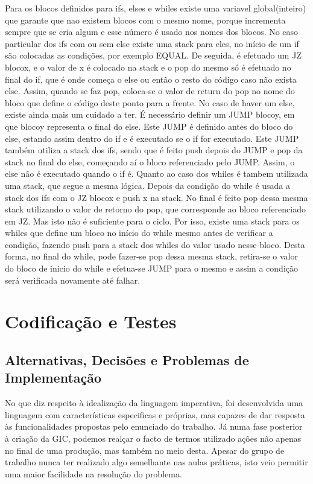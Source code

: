 \documentclass{report}
\begin{document}
Para os blocos definidos para ifs, elses e whiles existe uma variavel global(inteiro) que garante que nao existem blocos com o mesmo 
nome, porque incrementa sempre que se cria algum e esse número é usado nos nomes dos blocos. 
No caso particular dos ifs com ou sem else existe uma stack para eles, no início de um if são colocadas as condições, por exemplo
EQUAL. De seguida, é efetuado um JZ blocox, e o valor de x é colocado na stack e o pop do mesmo só é efetuado no final do if, que é 
onde começa o else ou então o resto do código caso não exista else. Assim, quando se faz pop, coloca-se o valor de return do pop no 
nome do bloco que define o código deste ponto para a frente. No caso de haver um else, existe ainda mais um cuidado a ter. É necessário
definir um JUMP blocoy, em que blocoy representa o final do else. Este JUMP é definido antes do bloco do else, estando assim dentro do if e é executado se o if for executado. Este JUMP também utiliza a stack dos ifs, sendo que é feito push depois do JUMP e pop da stack no 
final do else, começando aí o bloco referenciado pelo JUMP. Assim, o else não é executado quando o if é.
Quanto ao caso dos whiles é tambem utilizada uma stack, que segue a mesma lógica. Depois da condição do while é usada a stack dos ifs 
com o JZ blocox e push x na stack. No final é feito pop dessa mesma stack utilizando o valor de retorno do pop, que corresponde ao bloco 
referenciado em JZ. Mas isto não é suficiente para o ciclo. Por isso, existe uma stack para os whiles que define um bloco no início do while 
mesmo antes de verificar a condição, fazendo push para a stack dos whiles do valor usado nesse bloco. Desta forma, no final do while,
 pode fazer-se pop dessa mesma stack, retira-se o valor do bloco de inicio do while e efetua-se JUMP para o mesmo e assim a condição será verificada novamente até falhar.

\chapter{Codificação e Testes} \label{ct}
\section{Alternativas, Decisões e Problemas de Implementação}

No que diz respeito à idealização da linguagem imperativa, foi desenvolvida uma linguagem com características especificas e próprias, mas capazes de dar resposta às funcionalidades propostas pelo enunciado do trabalho. Já numa fase posterior à criação da GIC, podemos realçar o facto de termos utilizado ações não apenas no final de uma produção, mas também no meio desta. Apesar do grupo de trabalho nunca ter realizado algo semelhante nas aulas práticas, isto veio permitir uma maior facilidade na resolução do problema.
\end{document}
